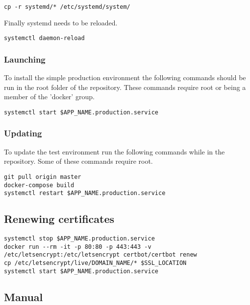 \begin{verbatim}
cp -r systemd/* /etc/systemd/system/
\end{verbatim}

Finally systemd needs to be reloaded.

\begin{verbatim}
systemctl daemon-reload
\end{verbatim}

\subsubsection{Launching}

To install the simple production environment the following commands should be run in the root folder of the repository.  These commands require root or being a member of the 'docker' group.

\begin{verbatim}
systemctl start $APP_NAME.production.service
\end{verbatim}

\subsubsection{Updating}

To update the test environment run the following commands while in the repository.  Some of these commands require root.

\begin{verbatim}
git pull origin master
docker-compose build
systemctl restart $APP_NAME.production.service
\end{verbatim}

\subsection{Renewing certificates} \label{section:certificate-renewal}

\begin{verbatim}
systemctl stop $APP_NAME.production.service
docker run --rm -it -p 80:80 -p 443:443 -v /etc/letsencrypt:/etc/letsencrypt certbot/certbot renew
cp /etc/letsencrypt/live/DOMAIN_NAME/* $SSL_LOCATION
systemctl start $APP_NAME.production.service
\end{verbatim}

\subsection{Manual}

